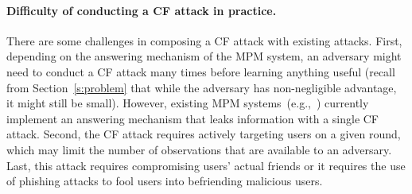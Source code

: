 \paragraph{Difficulty of conducting a CF attack in practice.}
There are some challenges in composing a CF attack with existing attacks.
First, depending on the answering mechanism of the MPM system, an adversary 
  might need to conduct a CF attack many times before learning anything useful 
  (recall from Section~\ref{s:problem} that while the adversary has 
  non-negligible advantage, it might still be small).
However, existing MPM systems~(e.g.,~\cite{angel16unobservable,
  vandenhoof15vuvuzela, lazar16alpenhorn}) currently implement an answering 
  mechanism that leaks information with a single CF attack.
Second, the CF attack requires actively targeting users on a given round, 
  which may limit the number of observations that are available to an adversary.
Last, this attack requires compromising users' actual friends 
  or it requires the use of phishing attacks to fool users into befriending 
  malicious users.
